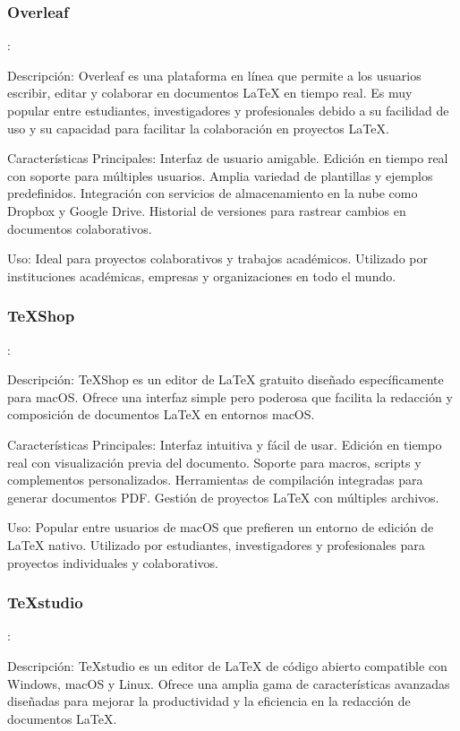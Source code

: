 \documentclass{article}
\begin{document}
\subsubsection{Overleaf}:

Descripción: Overleaf es una plataforma en línea que permite a los usuarios escribir, editar y colaborar en documentos LaTeX en tiempo real. Es muy popular entre estudiantes, investigadores y profesionales debido a su facilidad de uso y su capacidad para facilitar la colaboración en proyectos LaTeX.

Características Principales:
Interfaz de usuario amigable.
Edición en tiempo real con soporte para múltiples usuarios.
Amplia variedad de plantillas y ejemplos predefinidos.
Integración con servicios de almacenamiento en la nube como Dropbox y Google Drive.
Historial de versiones para rastrear cambios en documentos colaborativos.

Uso:
Ideal para proyectos colaborativos y trabajos académicos.
Utilizado por instituciones académicas, empresas y organizaciones en todo el mundo.


\subsubsection{TeXShop}:

Descripción: TeXShop es un editor de LaTeX gratuito diseñado específicamente para macOS. Ofrece una interfaz simple pero poderosa que facilita la redacción y composición de documentos LaTeX en entornos macOS.

Características Principales:
Interfaz intuitiva y fácil de usar.
Edición en tiempo real con visualización previa del documento.
Soporte para macros, scripts y complementos personalizados.
Herramientas de compilación integradas para generar documentos PDF.
Gestión de proyectos LaTeX con múltiples archivos.

Uso:
Popular entre usuarios de macOS que prefieren un entorno de edición de LaTeX nativo.
Utilizado por estudiantes, investigadores y profesionales para proyectos individuales y colaborativos.


\subsubsection{TeXstudio}:

Descripción: TeXstudio es un editor de LaTeX de código abierto compatible con Windows, macOS y Linux. Ofrece una amplia gama de características avanzadas diseñadas para mejorar la productividad y la eficiencia en la redacción de documentos LaTeX.
\end{document}
